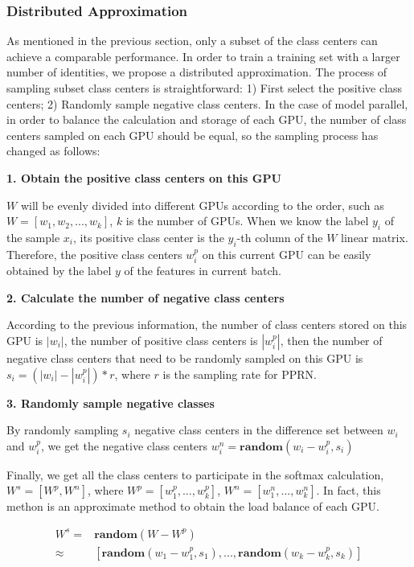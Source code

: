 \documentclass[letterpaper]{article} \usepackage{style/aaai21}  \usepackage{times}  \usepackage{helvet} \usepackage{courier}  \usepackage[hyphens]{url}  \usepackage{graphicx} \usepackage{color}
\begin{document}
\subsubsection{Distributed Approximation}
As mentioned in the previous section, only a subset of the class centers can achieve a comparable performance. In order to train a training set with a larger number of identities, we propose a distributed approximation. The process of sampling subset class centers is  straightforward: 1) First select the positive class centers; 2) Randomly sample negative class centers. In the case of model parallel, in order to balance the calculation and storage of each GPU, the number of class centers sampled on each GPU should be equal, so the sampling process has changed as follows: 

\noindent \textbf{1. Obtain the positive class centers on this GPU}  

$W$ will be evenly divided into different GPUs according to the order, such as $W=[w_{1}, w_{2}, ..., w_{k}]$, $k$ is the number of GPUs. When we know the label $y_i$ of the sample $x_i$, its positive class center is the $y_i$-th column of the $W$ linear matrix. Therefore, the positive class centers $w_i^p$ on this current GPU can be easily obtained by the label $y$ of the features in current batch.

\noindent \textbf{2. Calculate the number of negative class centers} 
  
According to the previous information, the number of class centers stored on this GPU is $|w_i|$, the number of positive class centers is $|w_i^p|$, then the number of negative class centers that need to be randomly sampled on this GPU is $s_i = (|w_i| - |w_i^p|) * r$, where $r$ is the sampling rate for PPRN.

\noindent \textbf{3. Randomly sample negative classes}  

By randomly sampling $s_i$ negative class centers in the difference set between $w_i$ and $w_i^p$, we get the negative class centers $w_i^n = \textbf{random}(w_i - w_i^p, s_i)$ 

Finally, we get all the class centers to participate in the softmax calculation, $W^s = [W^p, W^n]$, where $W^p = [w_1^p, ... , w_k^p]$, $W^n = [w_1^n, ... , w_k^n]$. In fact, this methon is an approximate method to obtain the load balance of each GPU.

\begin{small} 
\begin{equation}
\begin{split}
W^s = & \textbf{random}(W - {W^p}) \\
\approx & [\textbf{random}(w_1 - w^p_1, s_1), ..., \textbf{random}(w_k - w^p_k, s_k) ]
\end{split}
\end{equation}
\end{small}
\end{document}
